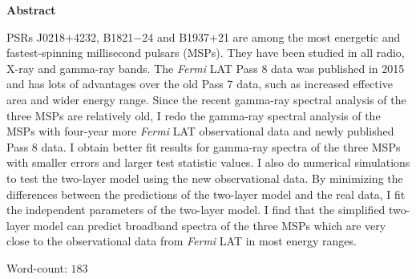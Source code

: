\documentclass[12pt]{report}
\begin{document}
  \begin{center}
    \Large \textbf{Abstract}
  \end{center}
  \doublespacing
  PSRs J0218+4232, B1821$-$24 and B1937+21 are among the most energetic and fastest-spinning 
  millisecond pulsars (MSPs). They have been studied in all radio, X-ray and gamma-ray bands. 
  The \textit{Fermi} LAT Pass 8 data was published in 2015 and has lots of advantages over 
  the old Pass 7 data, such as increased effective area and wider energy range. Since 
  the recent gamma-ray spectral analysis of the three MSPs are relatively old, 
  I redo the gamma-ray spectral analysis of the MSPs with 
  four-year more \textit{Fermi} LAT observational data and newly published Pass 8 data. 
  I obtain better fit results for gamma-ray spectra of the three MSPs with smaller errors 
  and larger test statistic values. I also do numerical simulations to test the 
  two-layer model using the new observational data. By minimizing the differences between 
  the predictions of the two-layer model and the real data, I fit the independent 
  parameters of the two-layer model. I find that the simplified two-layer model can 
  predict broadband spectra of the three MSPs which are very close to the observational data 
  from \textit{Fermi} LAT in most energy ranges.

  \vspace{2cm}
  \hspace*{10cm} Word-count: $183$
  
\end{document}
